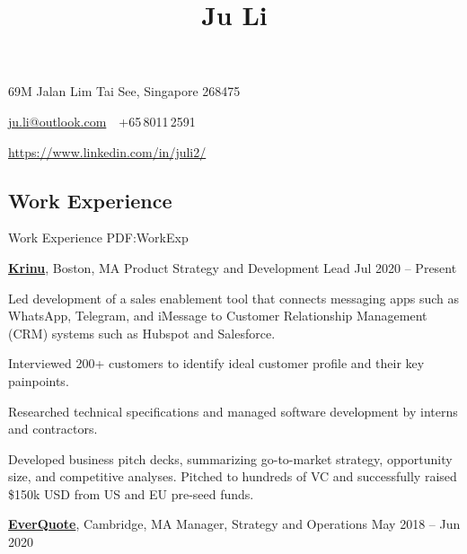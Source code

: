 \documentclass[letterpaper,10pt,oneside]{article}
\newcommand{\CVAuthor}{Ju Li}
\begin{document}

\title{\CVAuthor}

\begin{subtitle}
69M Jalan Lim Tai See, Singapore 268475
\par
\href{mailto:ju.li@outlook.com}
{ju.li@outlook.com}
\,\SubBulletSymbol\,
+65\,8011\,2591
\par 
\href{https://www.linkedin.com/in/juli2/}{https://www.linkedin.com/in/juli2/}
\end{subtitle}

\begin{body}


\section
{Work\newline
Experience}
{Work Experience}
{PDF:WorkExp}

\href{https://krinu.com/}
{\textbf{Krinu}},
Boston, MA
\GapNoBreak
Product Strategy and Development Lead
\hfill
Jul 2020 -- Present
\begin{flushleft}

\BulletItem Led development of a sales enablement tool that connects messaging apps such as WhatsApp, Telegram, and iMessage to Customer Relationship Management (CRM) systems such as Hubspot and Salesforce. 

\vspace{0.3em} \SubBulletItem Interviewed 200+ customers to identify ideal customer profile and their key painpoints. 

\vspace{0.3em} \SubBulletItem Researched technical specifications and managed software development by interns and contractors.

\vspace{0.75em}
\BulletItem Developed business pitch decks, summarizing go-to-market strategy, opportunity size, and competitive analyses. Pitched to hundreds of VC and successfully raised \$150k USD from US and EU pre-seed funds. 

\end{flushleft}


\href{http://www.everquote.com/}
{\textbf{EverQuote}},
Cambridge, MA
\GapNoBreak
Manager, Strategy and Operations
\hfill
May 2018 -- Jun 2020
\begin{flushleft}


\end{flushleft}
\end{body}
\end{document}
